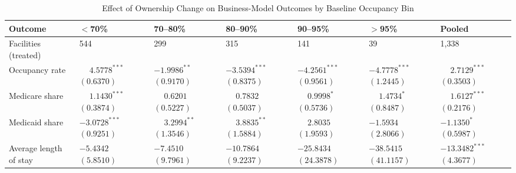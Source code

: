 \documentclass[11pt]{article}
\begin{document}
\begin{table}[!ht]
\centering
\begin{threeparttable}
\caption{Effect of Ownership Change on Business-Model Outcomes by Baseline Occupancy Bin}
\label{tab:het-occupancy-bin}
\small
\setlength{\tabcolsep}{6pt}

\begin{tabularx}{\textwidth}{@{} l Y Y Y Y Y Y @{}}
\toprule
Outcome & $<$70\% & 70--80\% & 80--90\% & 90--95\% & $>$95\% & Pooled \\
\midrule
Facilities (treated) & 544 & 299 & 315 & 141 & 39 & 1,338 \\
\addlinespace[0.4em]
Occupancy rate & $\phantom{-}4.5778^{***}$ $(0.6370)$ & $-1.9986^{**}$ $(0.9170)$ & $-3.5394^{***}$ $(0.8375)$ & $-4.2561^{***}$ $(0.9561)$ & $-4.7778^{***}$ $(1.2445)$ & $\phantom{-}2.7129^{***}$ $(0.3503)$ \\
\addlinespace[0.4em]
Medicare share & $\phantom{-}1.1430^{***}$ $(0.3874)$ & $\phantom{-}0.6201$ $(0.5227)$ & $\phantom{-}0.7832$ $(0.5037)$ & $\phantom{-}0.9998^{*}$ $(0.5736)$ & $\phantom{-}1.4734^{*}$ $(0.8487)$ & $\phantom{-}1.6127^{***}$ $(0.2176)$ \\
\addlinespace[0.4em]
Medicaid share & $-3.0728^{***}$ $(0.9251)$ & $\phantom{-}3.2994^{**}$ $(1.3546)$ & $\phantom{-}3.8835^{**}$ $(1.5884)$ & $\phantom{-}2.8035$ $(1.9593)$ & $-1.5934$ $(2.8066)$ & $-1.1350^{*}$ $(0.5987)$ \\
\addlinespace[0.4em]
Average length of stay & $-5.4342$ $(5.8510)$ & $-7.4510$ $(9.7961)$ & $-10.7864$ $(9.2237)$ & $-25.8434$ $(24.3878)$ & $-38.5415$ $(41.1157)$ & $-13.3482^{***}$ $(4.3677)$ \\
\bottomrule
\end{tabularx}


\end{threeparttable}
\end{table}
\end{document}
